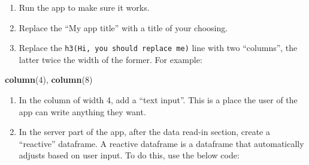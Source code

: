 \documentclass[
]{book}
\newenvironment{Shaded}{\begin{snugshade}}{\end{snugshade}}
\newcommand{\CommentTok}[1]{\textcolor[rgb]{0.56,0.35,0.01}{\textit{#1}}}
\newcommand{\DecValTok}[1]{\textcolor[rgb]{0.00,0.00,0.81}{#1}}
\newcommand{\KeywordTok}[1]{\textcolor[rgb]{0.13,0.29,0.53}{\textbf{#1}}}
\newcommand{\NormalTok}[1]{#1}
\newcommand{\OperatorTok}[1]{\textcolor[rgb]{0.81,0.36,0.00}{\textbf{#1}}}
\newcommand{\StringTok}[1]{\textcolor[rgb]{0.31,0.60,0.02}{#1}}
\begin{document}
\begin{enumerate}
\def\labelenumi{\arabic{enumi}.}
\setcounter{enumi}{4}
\item
  Run the app to make sure it works.
\item
  Replace the ``My app title'' with a title of your choosing.
\item
  Replace the \texttt{h3(\textquotesingle{}Hi,\ you\ should\ replace\ me\textquotesingle{})} line with two ``columns'', the latter twice the width of the former. For example:
\end{enumerate}

\begin{Shaded}
\begin{Highlighting}[]
\KeywordTok{column}\NormalTok{(}\DecValTok{4}\NormalTok{),}
\KeywordTok{column}\NormalTok{(}\DecValTok{8}\NormalTok{)}
\end{Highlighting}
\end{Shaded}

\begin{enumerate}
\def\labelenumi{\arabic{enumi}.}
\setcounter{enumi}{7}
\item
  In the column of width 4, add a ``text input''. This is a place the user of the app can write anything they want.
\item
  In the server part of the app, after the data read-in section, create a ``reactive'' dataframe. A reactive dataframe is a dataframe that automatically adjusts based on user input. To do this, use the below code:
\end{enumerate}

\begin{Shaded}
\end{Shaded}
\end{document}
